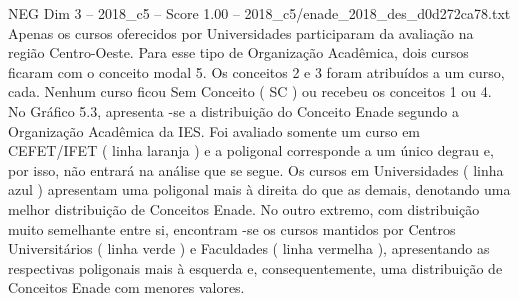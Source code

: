 \begin{textsample}{NEG Dim 3 – 2018\_c5 – Score 1.00 – 2018\_c5/enade\_2018\_des\_d0d272ca78.txt}
Apenas os cursos oferecidos por Universidades participaram da avaliação na região Centro-Oeste.
Para esse tipo de Organização Acadêmica, dois cursos ficaram com o conceito modal 5.
Os conceitos 2 e 3 foram atribuídos a um curso, cada.
Nenhum curso ficou Sem Conceito ( SC ) ou recebeu os conceitos 1 ou 4.
No Gráfico 5.3, apresenta -se a distribuição do Conceito Enade segundo a Organização Acadêmica da IES.
Foi avaliado somente um curso em CEFET/IFET ( linha laranja ) e a poligonal corresponde a um único degrau e, por isso, não entrará na análise que se segue.
Os cursos em Universidades ( linha azul ) apresentam uma poligonal mais à direita do que as demais, denotando uma melhor distribuição de Conceitos Enade.
No outro extremo, com distribuição muito semelhante entre si, encontram -se os cursos mantidos por Centros Universitários ( linha verde ) e Faculdades ( linha vermelha ), apresentando as respectivas poligonais mais à esquerda e, consequentemente, uma distribuição de Conceitos Enade com menores valores.

\end{textsample}
